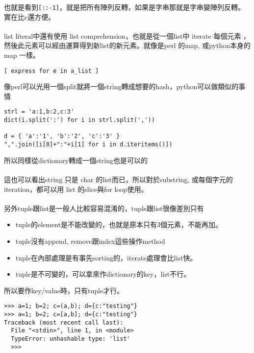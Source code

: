 也就是看到\verb=[::-1]=，就是把所有陣列反轉，如果是字串那就是字串變陣列反轉。
實在比c還方便。
\\\\
list literal中還有使用 list comprehension，也就是從一個list中 iterate 每個元素
，然後此元素可以經由運算得到新list的新元素。就像是perl 的map, 或python本身的map
一樣。
\begin{verbatim}
[ express for e in a_list ]
\end{verbatim}
像perl可以光用一個split就將一個string轉成想要的hash，python可以做類似的事情
\begin{verbatim}
strl = 'a:1,b:2,c:3'
dict(i.split(':') for i in strl.split(','))

d = { 'a':'1', 'b':'2', 'c':'3' }
",".join([i[0]+":"+i[1] for i in d.iteritems()])
\end{verbatim}
所以同樣從dictionary轉成一個string也是可以的
\\\\
這也可以看出string 只是 char 的list而已，所以對於substring, 或每個字元的
iteration，都可以用 list 的slice與for loop使用。
\\\\
另外tuple跟list是一般人比較容易混淆的，tuple跟list很像差別只有
\begin{itemize}
\item tuple的element是不能改變的，也就是原本只有3個元素，不能再加。
\item tuple沒有append, remove跟index這些操作method
\item tuple在內部處理是有事先sorting的，iterate處理會比list快。
\item tuple是不可變的，可以拿來作dictionary的key，list不行。
\end{itemize}

所以要作key/value時，只有tuple才行。
\begin{verbatim}
>>> a=1; b=2; c=(a,b); d={c:"testing"}
>>> a=1; b=2; c=[a,b]; d={c:"testing"}
Traceback (most recent call last):
  File "<stdin>", line 1, in <module>
  TypeError: unhashable type: 'list'
  >>> 
\end{verbatim}

